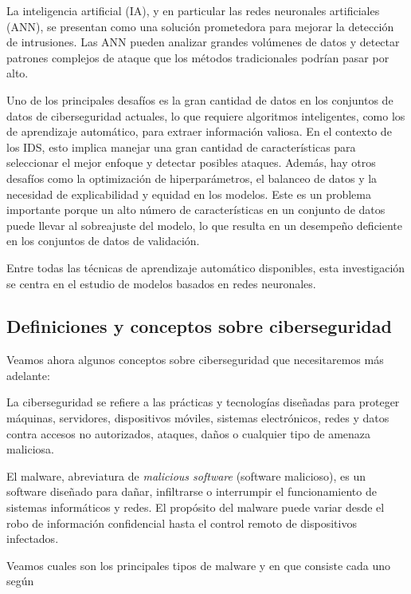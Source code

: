 La inteligencia artificial (IA), y en particular las redes neuronales artificiales (ANN), se presentan como una solución prometedora para mejorar la detección de intrusiones. Las ANN pueden analizar grandes volúmenes de datos y detectar patrones complejos de ataque que los métodos tradicionales podrían pasar por alto.

Uno de los principales desafíos es la gran cantidad de datos en los conjuntos de datos de ciberseguridad actuales, lo que requiere algoritmos inteligentes, como los de aprendizaje automático, para extraer información valiosa. En el contexto de los IDS, esto implica manejar una gran cantidad de características para seleccionar el mejor enfoque y detectar posibles ataques. Además, hay otros desafíos como la optimización de hiperparámetros, el balanceo de datos y la necesidad de explicabilidad y equidad en los modelos. Este es un problema importante porque un alto número de características en un conjunto de datos puede llevar al sobreajuste del modelo, lo que resulta en un desempeño deficiente en los conjuntos de datos de validación.

Entre todas las técnicas de aprendizaje automático disponibles, esta investigación se centra en el estudio de modelos basados en redes neuronales.

\subsection{Definiciones y conceptos sobre ciberseguridad}

Veamos ahora algunos conceptos sobre ciberseguridad que necesitaremos más adelante:

La ciberseguridad se refiere a las prácticas y tecnologías diseñadas para proteger máquinas, servidores, dispositivos móviles, sistemas electrónicos, redes y datos contra accesos no autorizados, ataques, daños o cualquier tipo de amenaza maliciosa. 

El malware, abreviatura de \textit{malicious software} (software malicioso), es un software diseñado para dañar, infiltrarse o interrumpir el funcionamiento de sistemas informáticos y redes. El propósito del malware puede variar desde el robo de información confidencial hasta el control remoto de dispositivos infectados. 

Veamos cuales son los principales tipos de malware y en que consiste cada uno según \citep{gounder2017new,luoma2023analysis}

